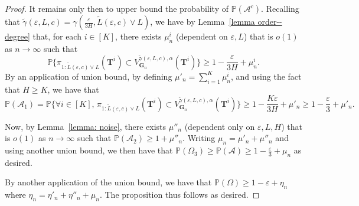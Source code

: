 \documentclass[twoside,11pt]{article}
\theoremstyle{remark}
\begin{document}
\begin{proof}
It remains only then to upper bound the probability of $\mathbb{P}(\mathcal{A}^c)$. 
Recalling that ${{\tilde{\gamma}(\varepsilon, L,c)}} = \gamma(\frac{\varepsilon}{3H}, {\tilde{L}(\varepsilon, c)} \vee L )$, we have by Lemma~\ref{lemma order--degree} that, for each $i \in [K]$, there exists $\mu^i_n$ (dependent on $\varepsilon, L$) that is $o(1)$ as $n \rightarrow \infty$ such that
\[
\mathbb{P}\bigl\{ \pi_{1:{\tilde{L}(\varepsilon, c)} \vee L }(\bm{T}^i) \subset V_{\bm{G}_n}^{{{\tilde{\gamma}(\varepsilon, L,c)}}, \alpha}(\bm{T}^i) \bigr\} \geq 1 - \frac{\varepsilon}{3H} + \mu^i_n.
\]
By an application of union bound, by defining $\mu'_n = \sum_{i=1}^K \mu^i_n$, and using the fact that $H \geq K$, we have that
\[
\mathbb{P}(\mathcal{A}_1)= \mathbb{P}\bigl\{\forall i \in [K],\,  \pi_{1:{\tilde{L}(\varepsilon, c)} \vee L }(\bm{T}^i) \subset V_{\bm{G}_n}^{{{\tilde{\gamma}(\varepsilon, L,c)}}, \alpha}(\bm{T}^i) \bigr\} \geq 1 - \frac{K\varepsilon}{3H} + \mu'_n \geq 1 -\frac{\varepsilon}{3} + \mu'_n.
\]

Now, by Lemma~\ref{lemma: noise}, there exists $\mu''_n$ (dependent only on $\varepsilon, L, H$) that is $o(1)$ as $n \rightarrow \infty$ such that $\mathbb{P}(\mathcal{A}_2) \geq 1 + \mu''_n$. Writing $\mu_n = \mu'_n + \mu''_n$ and using another union bound, we then have that $\mathbb{P}(\Omega_3)\geq \mathbb{P}(\mathcal{A}) \geq 1 - \frac{\varepsilon}{3} + \mu_n$ as desired. 


By another application of the union bound, we have that $\mathbb{P}(\Omega) \geq 1 - \varepsilon + \eta_n$ where 
$\eta_n = \eta'_n + \eta''_n + \mu_n$. The proposition thus follows as desired. 

\end{proof}
\end{document}
